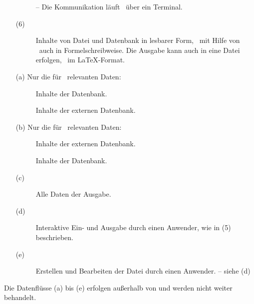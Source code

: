 \begin{itemize}
\begin{description}
		-- Die Kommunikation läuft \textiAlg\ über ein Terminal.
	\end{description}
	\item[(6)]\label{dat:Ausgabe}
	\begin{description}
		\item[]\label{dat:inAusgabe}
		Inhalte von Datei und Datenbank in lesbarer Form, \textua\ mit Hilfe von \Ausgabeschemata\ auch in Formelschreibweise.
		Die Ausgabe kann auch in eine Datei erfolgen,
		\textzB\ im \LaTeX-Format.
	\end{description}
	\item[(a)]\label{dat:extInternet}
	Nur die für \ASBA\ relevanten Daten:
	\begin{description}
		\item[]\label{dat:ausextInternet}
		Inhalte der Datenbank.
		\item[]\label{dat:inextInternet}
		Inhalte der externen Datenbank.
	\end{description}
	\item[(b)]\label{dat:extDatenbank}
	Nur die für \ASBA\ relevanten Daten:
	\begin{description}
		\item[]
		\label{dat:ausextDatenbank} Inhalte der externen Datenbank.
		\item[]
		\label{dat:inextDatenbank} Inhalte der Datenbank.
	\end{description}
	\item[(c)]\label{dat:AusgabeAnwender}
	\begin{description}
		\item[]\label{dat:Ausgabe2Anwender}
		Alle Daten der Ausgabe.
	\end{description}
	\item[(d)] \label{dat:AnwenderTerminal}
	\begin{description}
		\item[]\label{dat:Anwender22Terminal}
		Interaktive Ein- und Ausgabe durch einen Anwender, wie in (5) beschrieben.
	\end{description}
	\item[(e)] \label{dat:TerminalDatei}
	\begin{description}
		\item[]\label{dat:Terminal22Datei}
		Erstellen und Bearbeiten der Datei durch einen Anwender.
		-- siehe (d)
	\end{description}
\end{itemize}
Die Datenflüsse (a) bis (e) erfolgen außerhalb von \ASBA
und werden nicht weiter behandelt.

